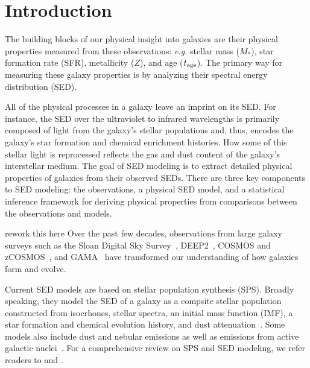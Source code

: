 \section{Introduction} \label{sec:intro} 
The building blocks of our physical insight into galaxies are their 
physical properties measured from these observations: \emph{e.g.} stellar mass ($M_*$), star formation rate
(SFR), metallicity ($Z$), and age ($t_{\rm age}$).
The primary way for measuring these galaxy properties is by analyzing their
spectral energy distribution (SED).

All of the physical processes in a galaxy leave an imprint on its SED.
For instance, the SED over the ultraviolet to infrared wavelengths is
primarily composed of light from the galaxy's stellar populations and, thus,
encodes the galaxy's star formation and chemical enrichment histories.  
How some of this stellar light is reprocessed reflects the gas and dust content
of the galaxy's interstellar medium.
The goal of SED modeling is to extract detailed physical properties of galaxies
from their observed SEDs. 
There are three key components to SED modeling: the observations, a physical SED
model, and a statistical inference framework for deriving physical properties 
from comparisons between the observations and models.

{\color{red} rework this here} 
Over the past few decades, observations from large galaxy surveys such as the
Sloan Digital Sky Survey~\citep[SDSS;][]{york2000}, DEEP2~\citep{davis2003},
COSMOS and zCOSMOS~\citep{scoville2007, lilly2007}, and GAMA~\citep{baldry2018}
have transformed our understanding of how galaxies form and evolve. 

Current SED models are based on stellar population synthesis (SPS).
Broadly speaking, they model the SED of a galaxy as a compsite stellar
population constructed from isocrhones, stellar spectra, an initial mass
function (IMF), a star formation and chemical evolution history, and dust
attenuation~\citep[\emph{e.g.}][]{bruzual2003, maraston2005, conroy2009}.
Some models also include dust and nebular emissions as well as emissions from
active galactic nuclei~\citep[\emph{e.g.}][]{johnson2021}.
For a comprehensive review on SPS and SED modeling, we refer readers to
\cite{walcher2011} and \cite{conroy2013}. 

